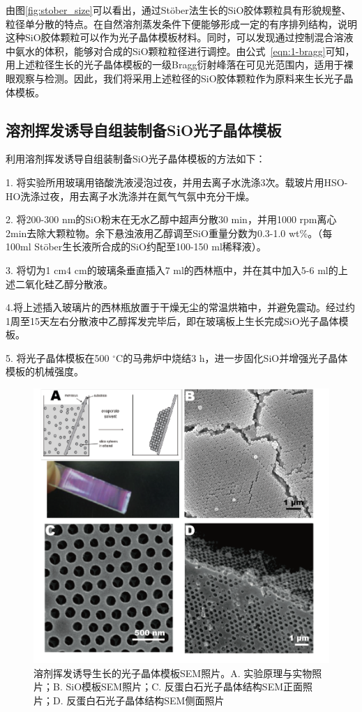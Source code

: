 由图\ref{fig:stober_size}可以看出，通过Stöber法生长的SiO胶体颗粒具有形貌规整、粒径单分散的特点。在自然溶剂蒸发条件下便能够形成一定的有序排列结构，说明这种SiO胶体颗粒可以作为光子晶体模板材料。同时，可以发现通过控制混合溶液中氨水的体积，能够对合成的SiO颗粒粒径进行调控。由公式~\ref{eqn:1-bragg}可知，用上述粒径生长的光子晶体模板的一级Bragg衍射峰落在可见光范围内，适用于裸眼观察与检测。因此，我们将采用上述粒径的SiO胶体颗粒作为原料来生长光子晶体模板。

\subsection{溶剂挥发诱导自组装制备SiO光子晶体模板}
\label{subsec:evap-template}

利用溶剂挥发诱导自组装制备SiO光子晶体模板的方法如下：

1. 将实验所用玻璃用铬酸洗液浸泡过夜，并用去离子水洗涤3次。载玻片用HSO-HO洗涤过夜，用去离子水洗涤并在氮气气氛中充分干燥。

2. 将200-300 nm的SiO粉末在无水乙醇中超声分散30 min，并用1000 rpm离心2min去除大颗粒物。余下悬浊液用乙醇调至SiO重量分数为0.3-1.0 wt\%。（每100ml Stöber生长液所合成的SiO约配至100-150 ml稀释液）。

3. 将切为1 cm\text{$\times$}4 cm的玻璃条垂直插入7 ml的西林瓶中，并在其中加入5-6 ml的上述二氧化硅乙醇分散液。

4.将上述插入玻璃片的西林瓶放置于干燥无尘的常温烘箱中，并避免震动。经过约1周至15天左右分散液中乙醇挥发完毕后，即在玻璃板上生长完成SiO光子晶体模板。

5. 将光子晶体模板在500 $^{\circ}$C的马弗炉中烧结3 h，进一步固化SiO并增强光子晶体模板的机械强度。

\begin{figure}[htbp]
  \centering
  \includegraphics[width=0.8\linewidth]{figures/ch2/opal-eval.png}
  \caption{溶剂挥发诱导生长的光子晶体模板SEM照片。A. 实验原理与实物照片；B. SiO模板SEM照片；C. 反蛋白石光子晶体结构SEM正面照片；D. 反蛋白石光子晶体结构SEM侧面照片}
  \label{fig:opal-SEM}
\end{figure}

